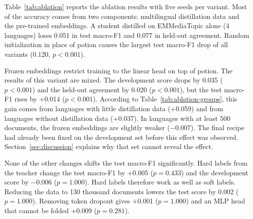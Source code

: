 \documentclass[journal]{IEEEtran}
\begin{document}
\begin{table}[!t]
\caption{Macro-F1 of Selected Variants by the Amount of Distillation Data in the Language of the Article (Test Set, Mean Over Seeds)}
\label{tab:ablation-groups}
\centering
\footnotesize
\setlength{\tabcolsep}{3pt}
\end{table}
Table~\ref{tab:ablation} reports the ablation results with five seeds per variant. Most of the accuracy comes from two components: multilingual distillation data and the pre-trained embeddings. A student distilled on EMMediaTopic alone (4 languages) loses 0.051 in test macro-F1 and 0.077 in held-out agreement. Random initialization in place of potion causes the largest test macro-F1 drop of all variants (0.120, $p<0.001$).

Frozen embeddings restrict training to the linear head on top of potion. The results of this variant are mixed. The development score drops by 0.035 ($p<0.001$) and the held-out agreement by 0.020 ($p<0.001$), but the test macro-F1 rises by +0.014 ($p<0.001$). According to Table~\ref{tab:ablation-groups}, this gain comes from languages with little distillation data (+0.059) and from languages without distillation data (+0.037). In languages with at least 500 documents, the frozen embeddings are slightly weaker ($-$0.007). The final recipe had already been fixed on the development set before this effect was observed. Section~\ref{sec:discussion} explains why that set cannot reveal the effect.

None of the other changes shifts the test macro-F1 significantly. Hard labels from the teacher change the test macro-F1 by +0.005 ($p=0.433$) and the development score by $-$0.006 ($p=1.000$). Hard labels therefore work as well as soft labels. Reducing the data to 130 thousand documents lowers the test score by 0.002 ($p=1.000$). Removing token dropout gives +0.001 ($p=1.000$) and an MLP head that cannot be folded +0.009 ($p=0.281$).
\end{document}
